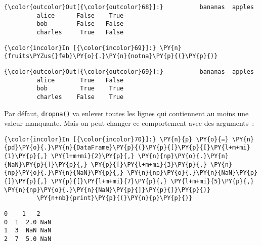 \begin{Verbatim}[commandchars=\\\{\},frame=single,framerule=0.3mm,rulecolor=\color{cellframecolor}]
{\color{outcolor}Out[{\color{outcolor}68}]:}          bananas  apples
         alice      False    True
         bob        False   False
         charles     True   False
\end{Verbatim}
            
    \begin{Verbatim}[commandchars=\\\{\},frame=single,framerule=0.3mm,rulecolor=\color{cellframecolor}]
{\color{incolor}In [{\color{incolor}69}]:} \PY{n}{fruits\PYZus{}feb}\PY{o}{.}\PY{n}{notna}\PY{p}{(}\PY{p}{)}
\end{Verbatim}


\begin{Verbatim}[commandchars=\\\{\},frame=single,framerule=0.3mm,rulecolor=\color{cellframecolor}]
{\color{outcolor}Out[{\color{outcolor}69}]:}          bananas  apples
         alice       True   False
         bob         True    True
         charles    False    True
\end{Verbatim}
            
    Par défaut, \texttt{dropna()} va enlever toutes les lignes qui
contiennent au moins une valeur manquante. Mais on peut changer ce
comportement avec des arguments~:

    \begin{Verbatim}[commandchars=\\\{\},frame=single,framerule=0.3mm,rulecolor=\color{cellframecolor}]
{\color{incolor}In [{\color{incolor}70}]:} \PY{n}{p} \PY{o}{=} \PY{n}{pd}\PY{o}{.}\PY{n}{DataFrame}\PY{p}{(}\PY{p}{[}\PY{p}{[}\PY{l+m+mi}{1}\PY{p}{,} \PY{l+m+mi}{2}\PY{p}{,} \PY{n}{np}\PY{o}{.}\PY{n}{NaN}\PY{p}{]}\PY{p}{,} \PY{p}{[}\PY{l+m+mi}{3}\PY{p}{,} \PY{n}{np}\PY{o}{.}\PY{n}{NaN}\PY{p}{,} \PY{n}{np}\PY{o}{.}\PY{n}{NaN}\PY{p}{]}\PY{p}{,} \PY{p}{[}\PY{l+m+mi}{7}\PY{p}{,} \PY{l+m+mi}{5}\PY{p}{,} \PY{n}{np}\PY{o}{.}\PY{n}{NaN}\PY{p}{]}\PY{p}{]}\PY{p}{)}
         \PY{n+nb}{print}\PY{p}{(}\PY{n}{p}\PY{p}{)}
\end{Verbatim}


    \begin{Verbatim}[commandchars=\\\{\},frame=single,framerule=0.3mm,rulecolor=\color{cellframecolor}]
   0    1   2
0  1  2.0 NaN
1  3  NaN NaN
2  7  5.0 NaN
\end{Verbatim}

